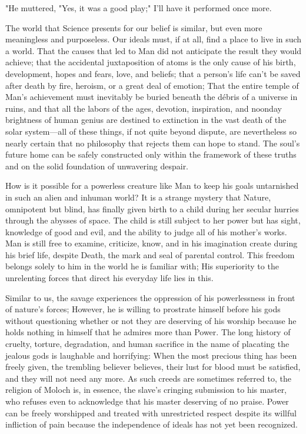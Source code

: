 \documentclass[a4paper,12pt]{book}[2004/02/16]
\theoremstyle{ilemma}
\theoremstyle{itheorem}
\theoremstyle{iother}
\theoremstyle{icorollary}
\theoremstyle{numcorollary}
\theoremstyle{idefinition}
\begin{document}
"He muttered, "Yes, it was a good play;" I'll have it performed once more.

The world that Science presents for our belief is similar, but even more meaningless and purposeless. Our ideals must, if at all, find a place to live in such a world. That the causes that led to Man did not anticipate the result they would achieve; that the accidental juxtaposition of atoms is the only cause of his birth, development, hopes and fears, love, and beliefs; that a person's life can't be saved after death by fire, heroism, or a great deal of emotion; That the entire temple of Man's achievement must inevitably be buried beneath the débris of a universe in ruins, and that all the labors of the ages, devotion, inspiration, and noonday brightness of human genius are destined to extinction in the vast death of the solar system—all of these things, if not quite beyond dispute, are nevertheless so nearly certain that no philosophy that rejects them can hope to stand. The soul's future home can be safely constructed only within the framework of these truths and on the solid foundation of unwavering despair.

How is it possible for a powerless creature like Man to keep his goals untarnished in such an alien and inhuman world? It is a strange mystery that Nature, omnipotent but blind, has finally given birth to a child during her secular hurries through the abysses of space. The child is still subject to her power but has sight, knowledge of good and evil, and the ability to judge all of his mother's works. Man is still free to examine, criticize, know, and in his imagination create during his brief life, despite Death, the mark and seal of parental control. This freedom belongs solely to him in the world he is familiar with; His superiority to the unrelenting forces that direct his everyday life lies in this.

Similar to us, the savage experiences the oppression of his powerlessness in front of nature's forces; However, he is willing to prostrate himself before his gods without questioning whether or not they are deserving of his worship because he holds nothing in himself that he admires more than Power.
The long history of cruelty, torture, degradation, and human sacrifice in the name of placating the jealous gods is laughable and horrifying: When the most precious thing has been freely given, the trembling believer believes, their lust for blood must be satisfied, and they will not need any more. As such creeds are sometimes referred to, the religion of Moloch is, in essence, the slave's cringing submission to his master, who refuses even to acknowledge that his master deserving of no praise. Power can be freely worshipped and treated with unrestricted respect despite its willful infliction of pain because the independence of ideals has not yet been recognized.
\end{document}
